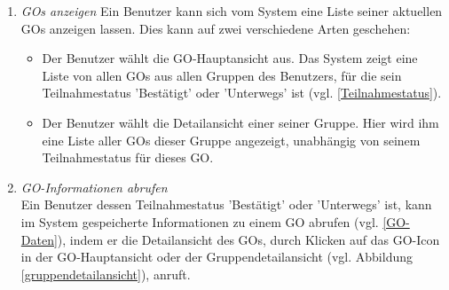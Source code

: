 \documentclass[parskip=full]{scrartcl}
\def\threedigits#1{%
  \ifnum#1<100 0\fi
  \ifnum#1<10 0\fi
  \number#1}
\begin{document}
\begin{enumerate}[label={\textbf{/F\protect\threedigits{\theenumi}0/}}, leftmargin=*, resume]	

	\item \textit{GOs anzeigen}\label{GOs anzeigen} Ein Benutzer kann sich vom System eine Liste seiner aktuellen GOs anzeigen lassen. Dies kann auf zwei verschiedene Arten geschehen:
	\begin{itemize}
		\item Der Benutzer wählt die GO-Hauptansicht aus. Das System zeigt eine Liste von allen GOs aus allen Gruppen des Benutzers, für die sein Teilnahmestatus 'Bestätigt' oder 'Unterwegs' ist (vgl. \ref{Teilnahmestatus}).
		\item Der Benutzer wählt die Detailansicht einer seiner Gruppe. Hier wird ihm eine Liste aller GOs dieser Gruppe angezeigt, unabhängig von seinem Teilnahmestatus für dieses GO.
	\end{itemize}
	
	\item \textit{GO-Informationen abrufen}\label{GO-Informationen abrufen} \\
	Ein Benutzer dessen Teilnahmestatus 'Bestätigt' oder 'Unterwegs' ist, kann im System gespeicherte Informationen zu einem GO abrufen (vgl. \ref{GO-Daten}), indem er die Detailansicht des GOs, durch Klicken auf das GO-Icon in der GO-Hauptansicht oder der Gruppendetailansicht (vgl. Abbildung \ref{gruppendetailansicht}), anruft.


\end{enumerate}
\end{document}
